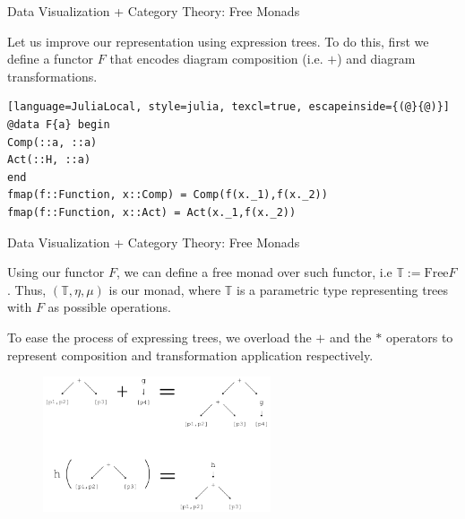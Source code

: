 \documentclass[aspectratio=169,xcolor=dvipsnames,10pt]{beamer}
\theoremstyle{definition}
\begin{document}
\begin{frame}[fragile]{Data Visualization + Category Theory: Free Monads}

  Let us improve our representation using expression trees.
  To do this, first we define a functor $F$ that encodes
  diagram composition (i.e. $+$) and diagram transformations.
\begin{lstlisting}[language=JuliaLocal, style=julia, texcl=true, escapeinside={(@}{@)}]
@data F{a} begin
Comp(::a, ::a)
Act(::H, ::a)
end
fmap(f::Function, x::Comp) = Comp(f(x._1),f(x._2))
fmap(f::Function, x::Act) = Act(x._1,f(x._2))
\end{lstlisting}

\end{frame}

\begin{frame}[fragile]{Data Visualization + Category Theory: Free Monads}

  Using our functor $F$, we can define a free monad over
  such functor, i.e $\mathbb T := \text{Free} F$. Thus,
  $(\mathbb T, \eta, \mu)$ is our monad, where $\mathbb T$ is a parametric type
  representing trees with $F$ as possible operations.

  To ease the process of expressing trees, we overload
  the $+$ and the $*$ operators to represent composition
  and transformation application respectively.

  \begin{figure}
    \begin{center}
        \includegraphics[width=0.6\textwidth]{./figs/composetrees.pdf}
    \end{center}
  \end{figure}
  
\end{frame}
\end{document}
